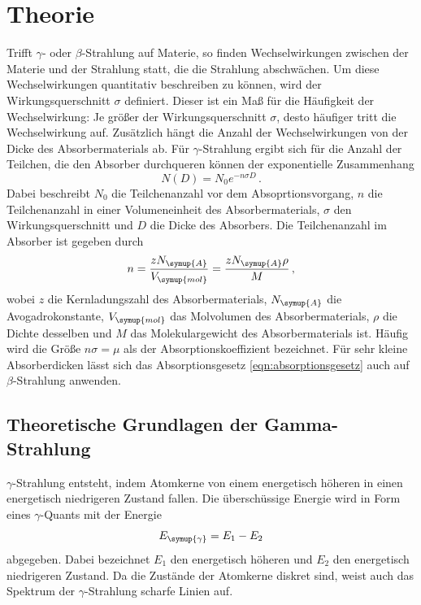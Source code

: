 \section{Theorie}
\label{sec:Theorie}
Trifft $\gamma$- oder $\beta$-Strahlung auf Materie, so finden Wechselwirkungen
zwischen der Materie und der Strahlung statt, die die Strahlung abschwächen. Um
diese Wechselwirkungen quantitativ beschreiben zu können, wird der Wirkungsquerschnitt
$\sigma$ definiert. Dieser ist ein Maß für die Häufigkeit der Wechselwirkung: Je größer
der Wirkungsquerschnitt $\sigma$, desto häufiger tritt die Wechselwirkung auf.
Zusätzlich hängt die Anzahl der Wechselwirkungen von der Dicke des Absorbermaterials ab.
Für $\gamma$-Strahlung ergibt sich für die Anzahl der Teilchen, die den Absorber
durchqueren können der exponentielle Zusammenhang
\begin{equation}
  N(D)=N_0 e^{-n \sigma D} \,.
  \label{eqn:absorptionsgesetz}
\end{equation}
Dabei beschreibt $N_0$ die Teilchenanzahl vor dem Absoprtionsvorgang, $n$ die
Teilchenanzahl in einer Volumeneinheit des Absorbermaterials, $\sigma$ den Wirkungsquerschnitt
und $D$ die Dicke des Absorbers. Die Teilchenanzahl im Absorber ist gegeben durch
\begin{equation}
 n=\frac{z N_{\symup{A}}}{V_{\symup{mol}}}=\frac{z N_{\symup{A}} \rho}{M} \,,
\end{equation}
wobei $z$ die Kernladungszahl des Absorbermaterials, $N_{\symup{A}}$ die Avogadrokonstante,
$V_{\symup{mol}}$ das Molvolumen des Absorbermaterials, $\rho$ die Dichte desselben und
$M$ das Molekulargewicht des Absorbermaterials ist.
Häufig  wird die Größe $n \sigma =\mu$ als der Absorptionskoeffizient bezeichnet.
Für sehr kleine Absorberdicken lässt sich das Absorptionsgesetz \eqref{eqn:absorptionsgesetz}
auch auf $\beta$-Strahlung anwenden.


\subsection{Theoretische Grundlagen der Gamma-Strahlung} %
\label{subsec:gamma}

$\gamma$-Strahlung entsteht, indem Atomkerne von einem energetisch höheren in einen
energetisch niedrigeren Zustand fallen. Die überschüssige Energie wird in Form eines
$\gamma$-Quants mit der Energie
\begin{equation}
  E_{\symup{\gamma}}= E_1 - E_2
\end{equation}
abgegeben. Dabei bezeichnet $E_1$ den energetisch höheren und $E_2$ den energetisch
niedrigeren Zustand. Da die Zustände der Atomkerne diskret sind, weist auch das
Spektrum der $\gamma$-Strahlung scharfe Linien auf.

